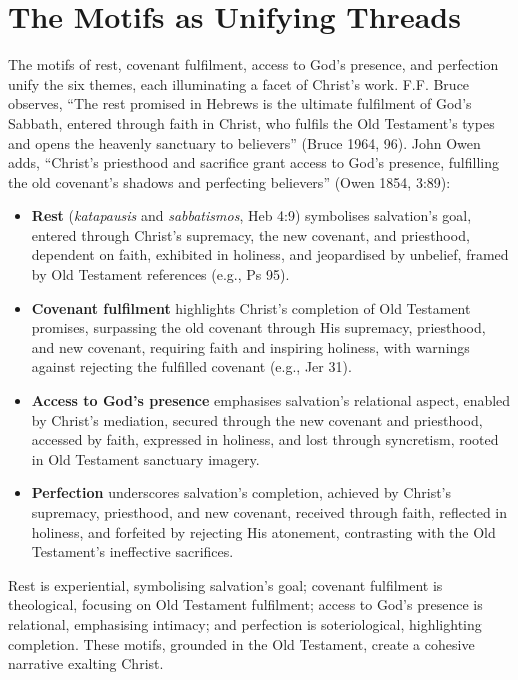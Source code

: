 \documentclass[12pt]{article}
\begin{document}
\section{The Motifs as Unifying Threads}
The motifs of rest, covenant fulfilment, access to God’s presence, and
perfection unify the six themes, each illuminating a facet of Christ’s work.
F.F. Bruce observes, ``The rest promised in Hebrews is the ultimate fulfilment
of God’s Sabbath, entered through faith in Christ, who fulfils the Old
Testament’s types and opens the heavenly sanctuary to believers'' (Bruce 1964,
96). John Owen adds, ``Christ’s priesthood and sacrifice grant access to God’s
presence, fulfilling the old covenant’s shadows and perfecting believers''
(Owen 1854, 3:89):
\begin{itemize}
    \item \textbf{Rest} (\textit{katapausis} and \textit{sabbatismos}, Heb 4:9)
    symbolises salvation’s goal, entered through Christ’s supremacy, the new
    covenant, and priesthood, dependent on faith, exhibited in holiness, and
    jeopardised by unbelief, framed by Old Testament references (e.g., Ps 95).
    \item \textbf{Covenant fulfilment} highlights Christ’s completion of Old
    Testament promises, surpassing the old covenant through His supremacy,
    priesthood, and new covenant, requiring faith and inspiring holiness, with
    warnings against rejecting the fulfilled covenant (e.g., Jer 31).
    \item \textbf{Access to God’s presence} emphasises salvation’s relational
    aspect, enabled by Christ’s mediation, secured through the new covenant and
    priesthood, accessed by faith, expressed in holiness, and lost through
    syncretism, rooted in Old Testament sanctuary imagery.
    \item \textbf{Perfection} underscores salvation’s completion, achieved by
    Christ’s supremacy, priesthood, and new covenant, received through faith,
    reflected in holiness, and forfeited by rejecting His atonement, contrasting
    with the Old Testament’s ineffective sacrifices.
\end{itemize}
Rest is experiential, symbolising salvation’s goal; covenant fulfilment is
theological, focusing on Old Testament fulfilment; access to God’s presence is
relational, emphasising intimacy; and perfection is soteriological,
highlighting completion. These motifs, grounded in the Old Testament, create a
cohesive narrative exalting Christ.
\end{document}
